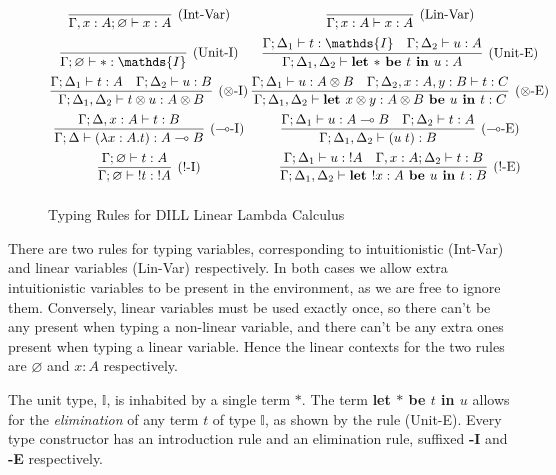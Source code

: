 \documentclass[]{unswthesis}
\let\emptyset\varnothing
\newcommand{\lolly}{\multimap}
\newcommand{\types}{\vdash}
\newcommand{\letbe}[3]{\textbf{let $#1$ be $#2$ in $#3$}}
\let\i\textit
\let\b\textbf
\begin{document}
\begin{figure}[h]
\caption{Typing Rules for DILL Linear Lambda Calculus}
\begin{displaymath}
\arraycolsep=1.4pt\def\arraystretch{2.2}
\begin{array}{cc}
\infer[\text{(Int-Var)}]{\Gamma, x : A; \emptyset \types x : A}{} &
\infer[\text{(Lin-Var)}]{\Gamma; x : A \types x : A}{} \\
\infer[\text{(Unit-I)}]{\Gamma; \emptyset \types * : \mathds{I}}{} &
\infer[\text{(Unit-E)}]
  {\Gamma; \Delta_1, \Delta_2 \types \letbe{*}{t}{u} : A}
  {\Gamma; \Delta_1 \types t : \mathds{I}  &  \Gamma; \Delta_2 \types u : A} \\
\infer[\text{($\otimes$-I)}]
  {\Gamma; \Delta_1, \Delta_2 \types t \otimes u : A \otimes B}
  {\Gamma; \Delta_1 \types t : A  &  \Gamma; \Delta_2 \types u : B} &
\infer[\text{($\otimes$-E)}]
  {\Gamma; \Delta_1, \Delta_2 \types \letbe{x \otimes y : A \otimes B}{u}{t} : C}
  {\Gamma; \Delta_1 \types u : A \otimes B  &  \Gamma; \Delta_2, x : A, y : B \types t : C} \\
\infer[\text{($\lolly$-I)}]
  {\Gamma; \Delta \types (\lambda x : A. t) : A \lolly B}
  {\Gamma; \Delta, x : A \types t : B} &
\infer[\text{($\lolly$-E)}]
  {\Gamma; \Delta_1, \Delta_2 \types (u \; t) : B}
  {\Gamma; \Delta_1 \types u : A \lolly B  &  \Gamma; \Delta_2 \types t : A} \\
\infer[\text{(!-I)}]
  {\Gamma; \emptyset \types {!t} : {!A}}
  {\Gamma; \emptyset \types t : A} &
\infer[\text{(!-E)}]
  {\Gamma; \Delta_1, \Delta_2 \types \letbe{!x : A}{u}{t} : B}
  {\Gamma; \Delta_1 \types u : {!A}  &  \Gamma, x : A; \Delta_2 \types t : B} \\
\end{array}
\end{displaymath}
\end{figure}

There are two rules for typing variables, corresponding to intuitionistic (Int-Var) and linear variables (Lin-Var) respectively. In both cases we allow extra intuitionistic variables to be present in the environment, as we are free to ignore them. Conversely, linear variables must be used exactly once, so there can't be any present when typing a non-linear variable, and there can't be any extra ones present when typing a linear variable. Hence the linear contexts for the two rules are $\emptyset$ and $x : A$ respectively.

The unit type, $\mathds{I}$, is inhabited by a single term $*$. The term \b{let $*$ be $t$ in $u$} allows for the \i{elimination} of any term $t$ of type $\mathds{I}$, as shown by the rule (Unit-E). Every type constructor has an introduction rule and an elimination rule, suffixed \b{-I} and \b{-E} respectively.
\end{document}
